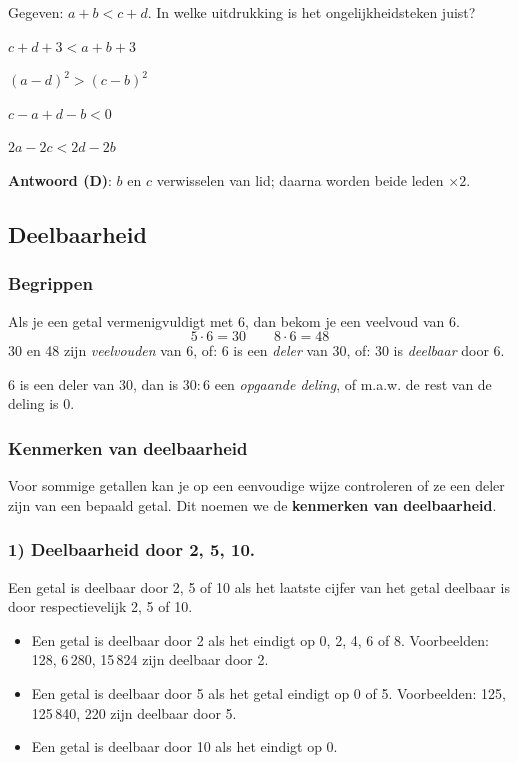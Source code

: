 \documentclass{bis}
\begin{document}
\begin{exercise}
Gegeven: $a+b<c+d$. In welke uitdrukking is het ongelijkheidsteken juist?
\begin{meerkeuze}
  \item $c+d+3<a+b+3$
  \item $(a-d)^2>(c-b)^2$
  \item $c-a+d-b<0$
  \item $2a-2c<2d-2b$
\end{meerkeuze}
\end{exercise}

\begin{solution}
\textbf{Antwoord (D)}: $b$ en $c$ verwisselen van lid; daarna worden beide leden $\times2$.
\end{solution}

\subsection{Deelbaarheid}

\subsubsection{Begrippen}

Als je een getal vermenigvuldigt met 6, dan bekom je een veelvoud van 6.
\[5\cdot6=30\qquad8\cdot6=48\]
30 en 48 zijn \emph{veelvouden} van 6, of: 6 is een \emph{deler} van 30, of: 30 is
\emph{deelbaar} door 6.

6 is een deler van 30, dan is $30:6$ een \emph{opgaande deling}, of m.a.w. de rest van de deling
is 0.

\subsubsection{Kenmerken van deelbaarheid}

Voor sommige getallen kan je op een eenvoudige wijze controleren of ze een deler zijn van een
bepaald getal. Dit noemen we de \textbf{kenmerken van deelbaarheid}.

\subsubsection*{1) Deelbaarheid door 2, 5, 10.}
Een getal is deelbaar door 2, 5 of 10 als het laatste cijfer van het getal deelbaar is door
respectievelijk 2, 5 of 10.
\begin{itemize}
  \item Een getal is deelbaar door 2 als het eindigt op 0, 2, 4, 6 of 8. Voorbeelden: 128,
  6\,280, 15\,824 zijn deelbaar door 2.
  \item Een getal is deelbaar door 5 als het getal eindigt op 0 of 5. Voorbeelden: 125,
  125\,840, 220 zijn deelbaar door 5.
  \item Een getal is deelbaar door 10 als het eindigt op 0.
\end{itemize}
\end{document}
